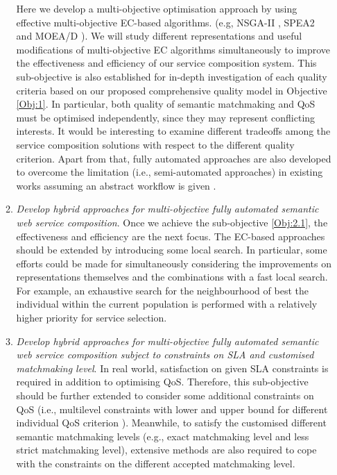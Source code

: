 \begin{enumerate}
\begin{enumerate}
    Here we develop a multi-objective optimisation approach by using effective multi-objective EC-based algorithms. (e.g, NSGA-II \cite{deb2002fast}, SPEA2 \cite{zitzler2001spea2} and MOEA/D \cite{zhang2007moea}). We will study different representations and useful modifications of multi-objective EC algorithms simultaneously to improve the effectiveness and efficiency of our service composition system. This sub-objective is also established for in-depth investigation of each quality criteria based on our proposed comprehensive quality model in Objective \ref{Obj:1}.  In particular, both quality of semantic matchmaking and QoS must be optimised independently, since they may represent conflicting interests. It would be interesting to examine different tradeoffs among the service composition solutions with respect to the different quality criterion. Apart from that, fully automated approaches are also developed to overcome the limitation (i.e., semi-automated approaches) in existing works assuming an abstract workflow is given .
   
    \item \emph{Develop hybrid approaches for multi-objective fully automated semantic web service composition}. Once we achieve the sub-objective \ref{Obj:2.1}, the effectiveness and efficiency are the next focus. The EC-based approaches should be extended by introducing some local search.  In particular, some efforts could be made for simultaneously considering the improvements on representations themselves and the combinations with a fast local search. For example, an exhaustive search for the neighbourhood of best the individual within the current population is performed with a relatively higher priority for service selection.

    \item \emph{Develop hybrid approaches for multi-objective fully automated semantic web service composition subject to constraints on SLA and customised matchmaking level}. In real world, satisfaction on given SLA constraints is required in addition to optimising QoS. Therefore, this sub-objective should be further extended to consider some additional constraints on  QoS (i.e., multilevel constraints with lower and upper bound for different individual QoS criterion \cite{yin2014hybrid}). Meanwhile, to satisfy the customised different semantic matchmaking levels (e.g., exact matchmaking level and less strict matchmaking level), extensive methods are also required to cope with the constraints on the different accepted matchmaking level.


\end{enumerate}
\end{enumerate}
